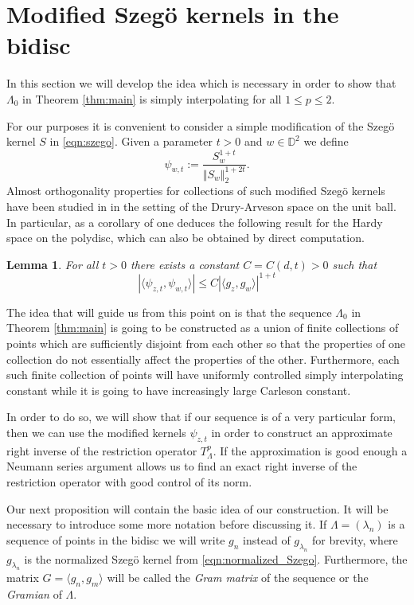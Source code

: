 \documentclass{amsart}
\numberwithin{equation}{section}
\newtheorem{lem}[thm]{Lemma}
\begin{document}
\section{Modified Szeg\"o kernels in the bidisc}
\label{sec:FangXia}
In this section we will develop the idea which is necessary in order to show that $\Lambda_0$ in Theorem \ref{thm:main} is simply interpolating for all $1\le p\le2$.

  For our purposes it is convenient to consider a simple modification of the Szegö kernel $S$ in \eqref{eqn:szego}. 
Given a parameter $t>0$ and $w\in \mathbb{D}^2$ we define 
\[ \psi_{w,t}:=\frac{S_w^{1+t}}{\Vert S_w\Vert_2^{1+2t}}. \]
Almost orthogonality properties for collections of such modified Szegö kernels have been studied in \cite{FangXia15} in the setting of the Drury-Arveson space on the unit ball. In particular, as a corollary of \cite[Lemma 5.1]{FangXia15} one deduces the following result for the Hardy space on the polydisc, which can also be obtained by direct computation.
\begin{lem} \label{prop:psi_estimate}
	For all $t>0$ there exists a constant $C=C(d, t)>0$ such that 
	\[ | \langle \psi_{z,t}, \psi_{w,t} \rangle| \leq C| \langle g_z , g_w \rangle |^{1+t} \]
\end{lem}

The idea that will guide us from this point on is that the sequence $\Lambda_0$ in Theorem \ref{thm:main} is going to be constructed as a union of finite collections of points which are sufficiently disjoint from each other so that the properties of one collection do not essentially affect the properties of the other.
Furthermore, each such finite collection of points will have uniformly controlled simply interpolating constant while it is going to have increasingly large Carleson constant.

In order to do so, we will show that if our sequence is of a very particular form, then we can use the modified kernels $\psi_{z,t}$ in order to construct an approximate right inverse of the restriction operator $T^p_\Lambda$. If the approximation is good enough a Neumann series argument allows us to find an exact right inverse of the restriction operator with good control of its norm.

Our next proposition will contain the basic idea of our construction. 
It will be necessary to introduce some more notation before discussing it. 
If $\Lambda=(\lambda_n)$ is a sequence of points in the bidisc we will write $g_n$ instead of $g_{\lambda_n}$ for brevity, where $g_{\lambda_n}$ is the normalized Szegö kernel from \eqref{eqn:normalized_Szego}. Furthermore, the matrix $G = \langle g_n, g_m \rangle$ will be called the {\it Gram matrix} of the sequence or the {\it Gramian} of $\Lambda.$
\end{document}
